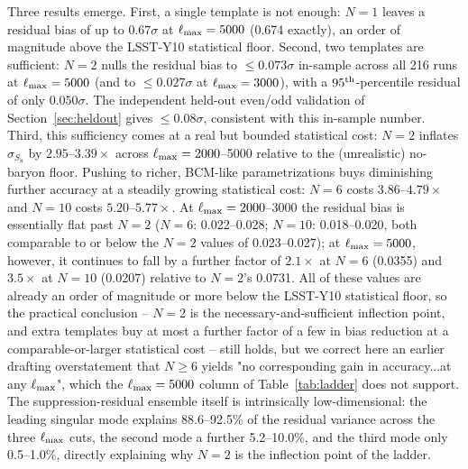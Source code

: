 \documentclass[11pt]{article}
\begin{document}
Three results emerge. First, a single template is not enough: $N=1$ leaves a
residual bias of up to $0.67\sigma$ at $\ell_{\rm max}=5000$ (0.674 exactly),
an order of magnitude above the LSST-Y10 statistical floor. %
Second, two templates are sufficient: $N=2$ nulls the residual bias to
$\le0.073\sigma$ in-sample across all 216 runs at $\ell_{\rm max}=5000$
(and to $\le0.027\sigma$ at $\ell_{\rm max}=3000$), with a $95^{\rm th}$-percentile
residual of only $0.050\sigma$. %
The independent held-out even/odd validation of Section~\ref{sec:heldout}
gives $\le0.08\sigma$, consistent with this in-sample number. %
Third, this sufficiency comes at a real but bounded statistical cost: $N=2$
inflates $\sigma_{S_8}$ by $2.95$--$3.39\times$ across $\ell_{\rm max}=2000$--5000
relative to the (unrealistic) no-baryon floor. %
Pushing to richer, BCM-like parametrizations buys diminishing further accuracy at
a steadily growing statistical cost: $N=6$ costs $3.86$--$4.79\times$ and $N=10$
costs $5.20$--$5.77\times$. At $\ell_{\rm max}=2000$--3000 the residual bias is
essentially flat past $N=2$ ($N=6$: 0.022--0.028; $N=10$: 0.018--0.020, both
comparable to or below the $N=2$ values of 0.023--0.027); at $\ell_{\rm max}=5000$,
however, it continues to fall by a further factor of $2.1\times$ at $N=6$ (0.0355)
and $3.5\times$ at $N=10$ (0.0207) relative to $N=2$'s 0.0731. All of these values
are already an order of magnitude or more below the LSST-Y10 statistical floor, so
the practical conclusion -- $N=2$ is the necessary-and-sufficient inflection point,
and extra templates buy at most a further factor of a few in bias reduction at a
comparable-or-larger statistical cost -- still holds, but we correct here an
earlier drafting overstatement that $N\ge6$ yields "no corresponding gain in
accuracy...at any $\ell_{\rm max}$", which the $\ell_{\rm max}=5000$ column of
Table~\ref{tab:ladder} does not support. %
The suppression-residual ensemble itself is intrinsically low-dimensional:
the leading singular mode explains 88.6--92.5\% of the residual variance
across the three $\ell_{\rm max}$ cuts, the second mode a further 5.2--10.0\%,
and the third mode only 0.5--1.0\%, directly explaining why $N=2$ is the
inflection point of the ladder. %
\end{document}
